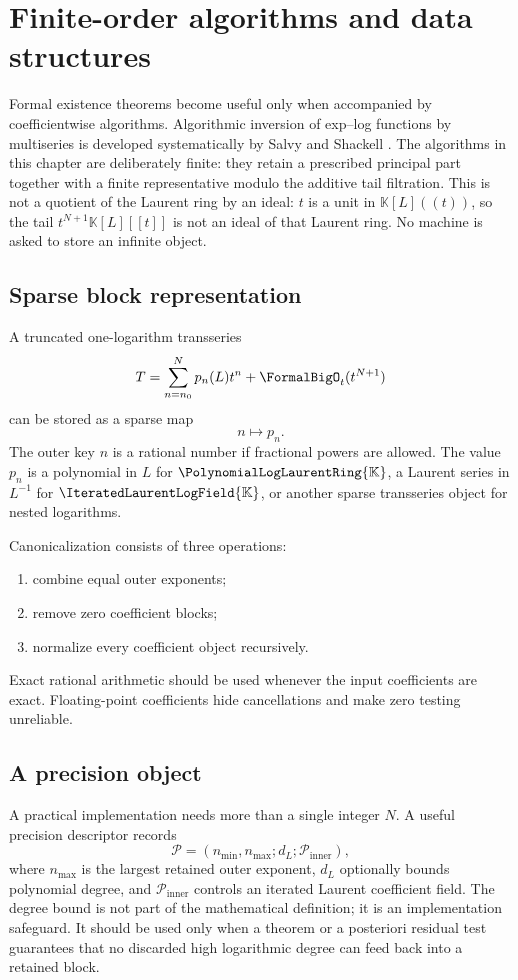 \documentclass[11pt,oneside]{book}
\theoremstyle{definition}
\theoremstyle{remark}
\newcommand{\K}{\mathbb K}
\newcommand{\PLpoly}{\PolynomialLogLaurentRing{\K}}
\newcommand{\PLfield}{\IteratedLaurentLogField{\K}}
\begin{document}
\chapter{Finite-order algorithms and data structures}
\label{ch:implementation}

Formal existence theorems become useful only when accompanied by
coefficientwise algorithms. Algorithmic inversion of exp--log functions by
multiseries is developed systematically by Salvy and Shackell
\cite{SalvyShackell1999}. The algorithms in this chapter are deliberately
finite: they retain a prescribed principal part together with a finite
representative modulo the additive tail filtration.  This is not a quotient
of the Laurent ring by an ideal: \(t\) is a unit in \(\K[L]((t))\), so the
tail \(t^{N+1}\K[L][[t]]\) is not an ideal of that Laurent ring.  No machine is
asked to store an infinite object.

\section{Sparse block representation}
A truncated one-logarithm transseries
\[
 T=\sum_{n=n_0}^{N}p_n(L)t^n+\FormalBigO_t(t^{N+1})
\]
can be stored as a sparse map
\[
 n\longmapsto p_n.
\]
The outer key $n$ is a rational number if fractional powers are allowed.
The value $p_n$ is a polynomial in $L$ for $\PLpoly$, a Laurent series in
$L^{-1}$ for $\PLfield$, or another sparse transseries object for nested
logarithms.

Canonicalization consists of three operations:
\begin{enumerate}
\item combine equal outer exponents;
\item remove zero coefficient blocks;
\item normalize every coefficient object recursively.
\end{enumerate}
Exact rational arithmetic should be used whenever the input coefficients are
exact. Floating-point coefficients hide cancellations and make zero testing
unreliable.

\section{A precision object}
A practical implementation needs more than a single integer $N$. A useful
precision descriptor records
\[
 \mathcal P=(n_{\min},n_{\max};d_L;\mathcal P_{\mathrm{inner}}),
\]
where $n_{\max}$ is the largest retained outer exponent, $d_L$ optionally
bounds polynomial degree, and $\mathcal P_{\mathrm{inner}}$ controls an
iterated Laurent coefficient field. The degree bound is not part of the
mathematical definition; it is an implementation safeguard. It should be
used only when a theorem or a posteriori residual test guarantees that no
discarded high logarithmic degree can feed back into a retained block.
\end{document}

